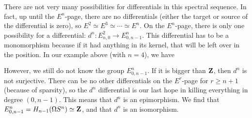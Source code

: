 There are not very many possibilities for differentials in this spectral
sequence. In fact, up until the $E^n$-page, there are no differentials (either
the target or source of the differential is zero), so $E^2\simeq E^3 \simeq
\cdots \simeq E^n$. On the $E^n$-page, there is only one possibility for a
differential: $d^n:E^2_{n,0} \to E^n_{0,n-1}$. This differential has to be a
monomorphism because if it had anything in its kernel, that will be left over
in the position. In our example above (with $n=4$), we have
\begin{center}
    \printpage[name={loops-Sn},page=4]
\end{center}

However, we still do not know the group $E^n_{0,n-1}$. If it is bigger than
$\mathbf Z$, then $d^n$ is not surjective. There can be no other differentials on the
$E^r$-page for $r\geq n+1$ (because of sparsity), so the $d^n$ differential is
our last hope in killing everything in degree $(0,n-1)$.  This means that $d^n$
is an epimorphism. We find that $E^n_{0,n-1} = H_{n-1}(\Omega S^n) \simeq \mathbf Z$,
and that $d^n$ is an isomorphism.

